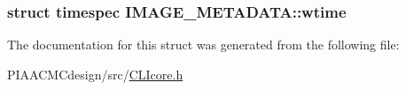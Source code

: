 \hypertarget{structIMAGE__METADATA_a5a4dfe37e26ea28f88f85df4dde00600}{
\subsubsection[{wtime}]{\setlength{\rightskip}{0pt plus 5cm}struct timespec I\+M\+A\+G\+E\+\_\+\+M\+E\+T\+A\+D\+A\+T\+A\+::wtime}}\label{structIMAGE__METADATA_a5a4dfe37e26ea28f88f85df4dde00600}


The documentation for this struct was generated from the following file\+:\begin{DoxyCompactItemize}
\item 
P\+I\+A\+A\+C\+M\+Cdesign/src/\hyperlink{PIAACMCdesign_2src_2CLIcore_8h}{C\+L\+Icore.\+h}\end{DoxyCompactItemize}
